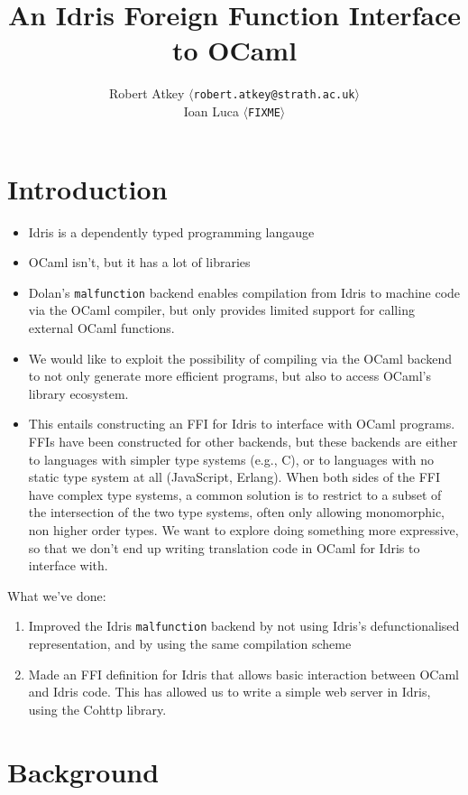 \documentclass[a4paper,twocolumn]{article}
\title{An Idris Foreign Function Interface to OCaml}
\author{Robert Atkey  $\langle$\texttt{robert.atkey@strath.ac.uk}$\rangle$ \\
  Ioan Luca $\langle$\texttt{FIXME}$\rangle$}
\date{}
\newcommand{\malfunction}{\texttt{malfunction}}
\begin{document}
\maketitle

\section{Introduction}



\begin{itemize}
\item Idris is a dependently typed programming langauge
\item OCaml isn't, but it has a lot of libraries
\item Dolan's \texttt{malfunction} backend enables compilation from
  Idris to machine code via the OCaml compiler, but only provides
  limited support for calling external OCaml functions.
\item We would like to exploit the possibility of compiling via the
  OCaml backend to not only generate more efficient programs, but also
  to access OCaml's library ecosystem.
\item This entails constructing an FFI for Idris to interface with
  OCaml programs. FFIs have been constructed for other backends, but
  these backends are either to languages with simpler type systems
  (e.g., C), or to languages with no static type system at all
  (JavaScript, Erlang). When both sides of the FFI have complex type
  systems, a common solution is to restrict to a subset of the
  intersection of the two type systems, often only allowing
  monomorphic, non higher order types. We want to explore doing
  something more expressive, so that we don't end up writing
  translation code in OCaml for Idris to interface with.
\end{itemize}

What we've done:
\begin{enumerate}
\item Improved the Idris \malfunction{} backend by not using Idris's
  defunctionalised representation, and by using the same compilation
  scheme
\item Made an FFI definition for Idris that allows basic interaction
  between OCaml and Idris code. This has allowed us to write a simple
  web server in Idris, using the Cohttp library.
\end{enumerate}

\section{Background}
\end{document}
